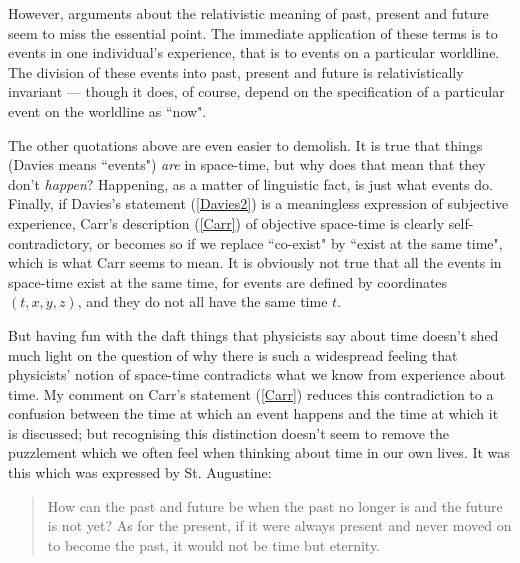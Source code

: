 \documentclass[12pt,a4paper,reqno]{article}
\renewcommand{\(}{\left(}
\renewcommand{\)}{\right)}
\newcommand{\<}{\langle}
\renewcommand{\>}{\rangle}
\theoremstyle{plain} %
\theoremstyle{definition}
\theoremstyle{remark}
\begin{document}
However, arguments about the relativistic meaning of past, present and
future seem to miss the essential point. The immediate application of
these terms is to events in one individual's experience, that is to
events on a particular worldline. The division of these events into
past, present and future is relativistically invariant --- though it
does, of course, depend on the specification of a particular event on
the worldline as ``now".

The other quotations above are even easier to demolish. It is true that things (Davies
means ``events") \emph{are} in space-time, but why does that mean that they
don't \emph{happen}? Happening, as a matter of linguistic fact, is just 
what events do. Finally, if Davies's statement (\ref{Davies2}) is a
meaningless expression of subjective experience, Carr's description
(\ref{Carr}) of objective space-time is clearly self-contradictory, or
becomes so if we replace ``co-exist" by ``exist at the same time", which
is what Carr seems to mean. It is obviously not true that all the events
in space-time exist at the same time, for events are defined by coordinates
$(t,x,y,z)$, and they do not all have the same time $t$.

But having fun with the daft things that physicists say about time
doesn't shed much light on the question of why there is such a
widespread feeling that physicists' notion of space-time contradicts
what we know from experience about time. My comment on Carr's statement
(\ref{Carr}) reduces this contradiction to a confusion between the time
at which an event happens and the time at which it is discussed; but
recognising this distinction doesn't seem to remove the puzzlement which
we often feel when thinking about time in our own lives. It was this
which was expressed by St. Augustine:

\begin{quotation} 
How can the past and future be when the past no longer is and
the future is not yet? As for the present, if it were always present and
never moved on to become the past, it would not be time but eternity.
\end{quotation}
\end{document}
